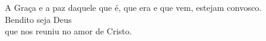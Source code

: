 A Graça e a paz daquele que é, que era e que vem, estejam convosco. \\
\RbarRed{} Bendito seja Deus \\ que nos reuniu no amor de Cristo.
\vspace{.2cm} \\
